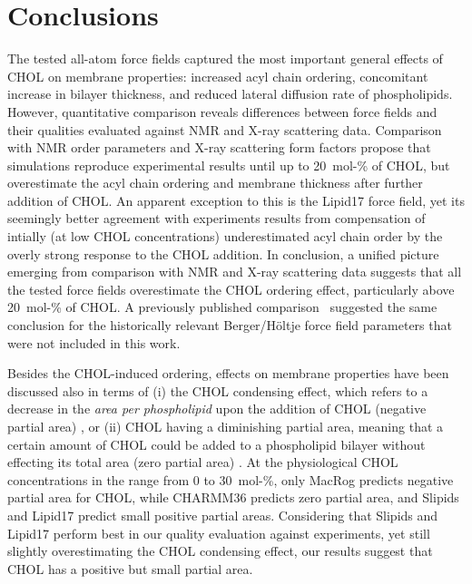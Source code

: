 \documentclass[journal=jctcce]{achemso}
\begin{document}
\section{Conclusions}

The tested all-atom force fields captured the most important general effects of CHOL on membrane properties: increased acyl chain ordering, concomitant increase in bilayer thickness, and reduced lateral diffusion rate of phospholipids. However, quantitative comparison reveals differences between force fields and their qualities evaluated against NMR and X-ray scattering data. Comparison with NMR order parameters and X-ray scattering form factors propose that simulations reproduce experimental results until up to 20~mol-\% of CHOL, but overestimate the acyl chain ordering and membrane thickness after further addition of CHOL. An apparent exception to this is the Lipid17 force field, yet its seemingly better agreement with experiments results from compensation of intially (at low CHOL concentrations) underestimated acyl chain order by the overly strong response to the CHOL addition. In conclusion, a unified picture emerging from comparison with NMR and X-ray scattering data suggests that all the tested force fields overestimate the CHOL ordering effect, particularly above 20~mol-\% of CHOL. A previously published comparison~\cite{ferreira13} suggested the same conclusion for the historically relevant Berger/H{\"o}ltje force field parameters \cite{Berger97,Holtje01} that were not included in this work.

Besides the CHOL-induced ordering, effects on membrane properties have been discussed also in terms of (i) the CHOL condensing effect, which refers to a decrease in the \emph{area per phospholipid} upon the addition of CHOL (negative partial area) \cite{edholm2005areas}, or (ii) CHOL having a diminishing partial area, meaning that a certain amount of CHOL could be added to a phospholipid bilayer without effecting its total area (zero partial area) \cite{javanainen2017two}. At the physiological CHOL concentrations in the range from 0 to 30~mol-\%, only MacRog predicts negative partial area for CHOL, while CHARMM36 predicts zero partial area, and Slipids and Lipid17 predict small positive partial areas. Considering that Slipids and Lipid17 perform best in our quality evaluation against experiments, yet still slightly overestimating the CHOL condensing effect, our results suggest that CHOL has a positive but small partial area.
\end{document}
